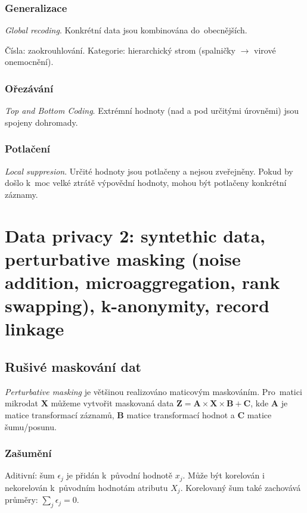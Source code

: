 \subsubsection*{Generalizace}

\emph{Global recoding}.
Konkrétní data jsou kombinována do~obecnějších.

Čísla: zaokrouhlování.
Kategorie: hierarchický strom (spalničky $\rightarrow$ virové onemocnění).


\subsubsection*{Ořezávání}

\emph{Top and Bottom Coding}.
Extrémní hodnoty (nad a pod určitými úrovněmi) jsou spojeny dohromady.


\subsubsection*{Potlačení}

\emph{Local suppresion}.
Určité hodnoty jsou potlačeny a nejsou zveřejněny.
Pokud by došlo k~moc velké ztrátě výpovědní hodnoty, mohou být potlačeny konkrétní záznamy.



\clearpage
\section{Data privacy 2: syntethic data, perturbative masking (noise addition, microaggregation, rank swapping), k-anonymity, record linkage}


\subsection{Rušivé maskování dat}

\emph{Perturbative masking} je většinou realizováno maticovým maskováním.
Pro~matici mikrodat $\mathbf{X}$ můžeme vytvořit maskovaná data $\textbf{Z} = \textbf{A} \times \textbf{X} \times \mathbf{B} + \textbf{C}$, kde \textbf{A} je matice transformací záznamů, \textbf{B} matice transformací hodnot a \textbf{C} matice šumu/posunu.


\subsubsection*{Zašumění}

Aditivní: šum $\epsilon_j$ je přidán k~původní hodnotě $x_j$.
Může být korelován i nekorelován k~původním hodnotám atributu $X_j$.
Korelovaný šum také zachovává průměry: $\sum_j \epsilon_j = 0$.

